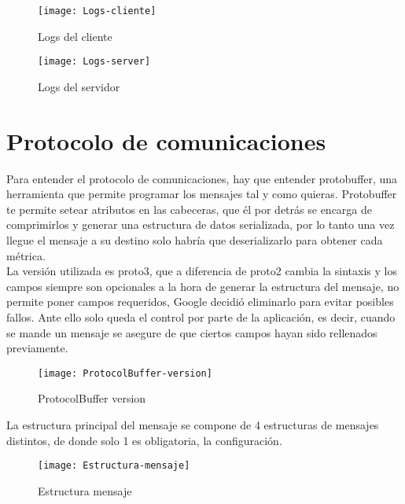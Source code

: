 \documentclass[ spanish, a4paper, 12pt, oneside]{report}
\begin{document}
\begin{figure}[!h]
   \centering
   \texttt{[image: Logs-cliente]}\\
      \caption{\label{fig: Logs del cliente} Logs del cliente}
\end{figure}

\begin{figure}[!h]
   \centering
   \texttt{[image: Logs-server]}\\
      \caption{\label{fig: Logs del servidor} Logs del servidor}
\end{figure}

\section{Protocolo de comunicaciones}

Para entender el protocolo de comunicaciones, hay que entender protobuffer, una herramienta que permite programar los mensajes tal y como quieras. Protobuffer te permite setear atributos en las cabeceras, que él por detrás se encarga de 
comprimirlos y generar una estructura de datos serializada, por lo tanto una vez llegue el mensaje a su destino solo habría que deserializarlo para obtener cada métrica. \\

La versión utilizada es proto3, que a diferencia de proto2 cambia la sintaxis y los campos siempre son opcionales a la hora de generar la estructura del mensaje, no permite poner campos requeridos, Google decidió eliminarlo para 
evitar posibles fallos. Ante ello solo queda el control por parte de la aplicación, es decir, cuando se mande un mensaje se asegure de que ciertos campos hayan sido rellenados previamente. \\


\begin{figure}[!h]
   \centering
   \texttt{[image: ProtocolBuffer-version]}\\
      \caption{\label{fig: ProtocolBuffer version} ProtocolBuffer version}
\end{figure}

La estructura principal del mensaje se compone de 4 estructuras de mensajes distintos, de donde solo 1 es obligatoria, la configuración. \\

\begin{figure}[!h]
   \centering
   \texttt{[image: Estructura-mensaje]}\\
      \caption{\label{fig: Estructura mensaje} Estructura mensaje}
\end{figure}
\end{document}
